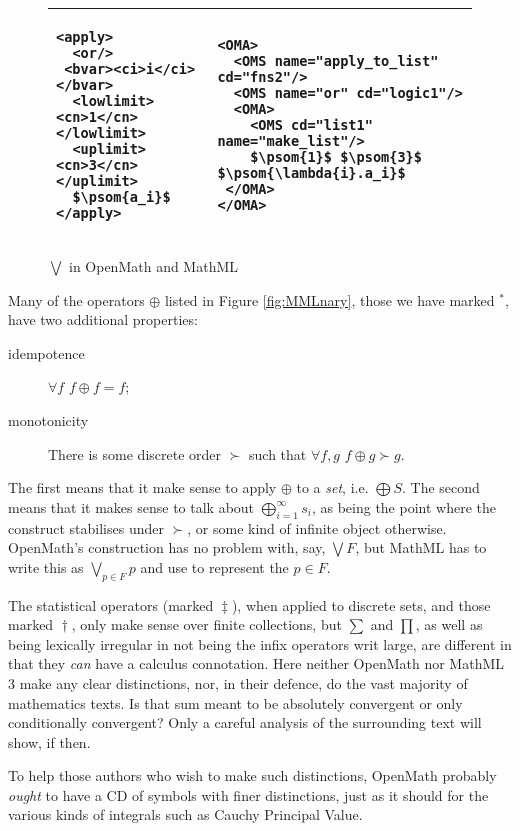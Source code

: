\documentclass{llncs}
\begin{document}
{\begin{figure}[ht]\centering%
\lstset{language=MathML2,mathescape,frame=none,numbers=none}
\lstset{mathescape,aboveskip=-.7em,belowskip=-1.2em}
\begin{tabular}{|p{5.7cm}|p{5.8cm}|}\hline
\begin{lstlisting}
<apply>
  <or/>
 <bvar><ci>i</ci></bvar>
  <lowlimit><cn>1</cn></lowlimit>
  <uplimit><cn>3</cn></uplimit>
  $\psom{a_i}$
</apply>
\end{lstlisting}
& \lstset{language=OpenMath}
\begin{lstlisting}
<OMA>
  <OMS name="apply_to_list" cd="fns2"/>
  <OMS name="or" cd="logic1"/>
  <OMA>
    <OMS cd="list1" name="make_list"/>
    $\psom{1}$ $\psom{3}$ $\psom{\lambda{i}.a_i}$
 </OMA>
</OMA>
\end{lstlisting}\\\hline
\end{tabular}\vspace*{-.5em}
\caption{$\bigvee$ in OpenMath and MathML}\label{fig:bigvee}\vspace*{-1.5em}
\end{figure}

Many of the operators $\oplus$ listed in Figure \ref{fig:MMLnary}, those we
have marked ${}^*$, have two additional properties:
\begin{description}
\item[idempotence]$\forall f$ $f\oplus f=f$;
\item[monotonicity]There is some discrete order $\succ$ such that $\forall
f,g$ $f\oplus g\succ g$.
\end{description}
The first means that it make sense to apply $\oplus$ to a {\it set\/}, i.e.
$\bigoplus S$. The second means that it makes sense to talk about
$\bigoplus_{i=1}^\infty s_i$, as being the point where the construct
stabilises under $\succ$, or some kind of infinite object otherwise. 
OpenMath's construction has no problem with, say, $\bigvee F$, but MathML has to
write this as $\bigvee_{p\in F}p$ and use {} to represent
the $p\in F$.
\par
The statistical operators (marked ${}\ddag$), when applied to discrete sets,
and those marked ${}\dag$, only make sense over finite collections, but $\sum$
and $\prod$, as well as being lexically irregular in not being the infix
operators writ large, are different in that they {\it can\/} have a calculus
connotation. Here neither OpenMath nor MathML 3 make any clear distinctions,
nor, in their defence, do the vast majority of mathematics texts. Is that sum
meant to be absolutely convergent or only conditionally convergent? Only a
careful analysis of the surrounding text will show, if then.
\par
To help those authors who wish to make such distinctions, OpenMath probably
{\it ought\/} to have a CD of symbols with finer distinctions, just as it should for
the various kinds of integrals such as Cauchy Principal Value.
}
\end{document}
